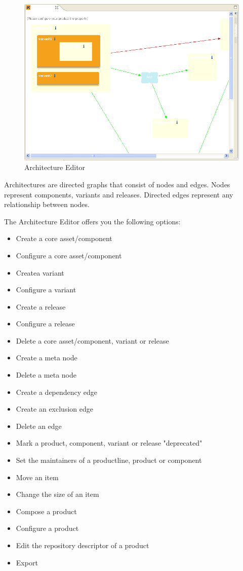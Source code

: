 \begin{figure}[h!]
\begin{center}
\includegraphics[width=15cm]{architecture.png}
   \caption{Architecture Editor}
\label{architecture}
\end{center}
\end{figure}\par

Architectures are directed graphs that consist of nodes and edges. 
Nodes represent components, variants and releases. Directed edges represent
any relationship between nodes.\par

The Architecture Editor offers you the following options:
\begin{itemize}
	\item Create a core asset/component
	\item Configure a core asset/component
	\item Createa variant
	\item Configure a variant
	\item Create a release
	\item Configure a release
	\item Delete a core asset/component, variant or release
	\item Create a meta node
	\item Delete a meta node
	\item Create a dependency edge
	\item Create an exclusion edge
	\item Delete an edge
	\item Mark a product, component, variant or release "deprecated"
	\item Set the maintainers of a productline, product or component
	\item Move an item
	\item Change the size of an item
	\item Compose a product
	\item Configure a product
	\item Edit the repository descriptor of a product
	\item Export
\end{itemize}

